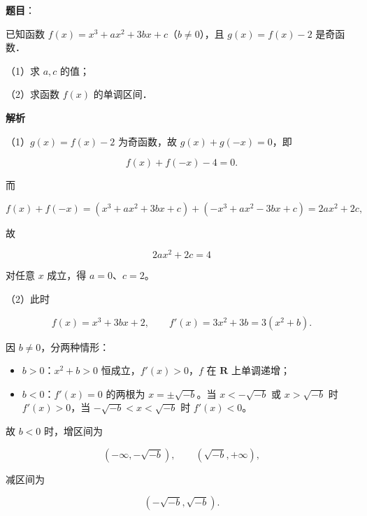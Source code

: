 \begin{answer}

\textbf{题目}：

已知函数 $f(x)=x^3+ax^2+3bx+c$（$b\neq0$），且 $g(x)=f(x)-2$ 是奇函数．

（1）求 $a,c$ 的值；

（2）求函数 $f(x)$ 的单调区间．

\textbf{解析}

（1）$g(x)=f(x)-2$ 为奇函数，故 $g(x)+g(-x)=0$，即

\nopagebreak[4]
\[f(x)+f(-x)-4=0 .\]

而

\nopagebreak[4]
\[f(x)+f(-x)=(x^3+ax^2+3bx+c)+(-x^3+ax^2-3bx+c)=2ax^2+2c,\]

故

\nopagebreak[4]
\[2ax^2+2c=4\]

对任意 $x$ 成立，得 $a=0$、$c=2$。

（2）此时

\nopagebreak[4]
\[f(x)=x^3+3bx+2,\qquad f'(x)=3x^2+3b=3(x^2+b).\]

因 $b\neq0$，分两种情形：

\begin{itemize}
\item $b>0$：$x^2+b>0$ 恒成立，$f'(x)>0$，$f$ 在 $\mathbf R$ 上单调递增；
\item $b<0$：$f'(x)=0$ 的两根为 $x=\pm\sqrt{-b}$。当 $x<-\sqrt{-b}$ 或 $x>\sqrt{-b}$ 时 $f'(x)>0$，当 $-\sqrt{-b}<x<\sqrt{-b}$ 时 $f'(x)<0$。
\end{itemize}

故 $b<0$ 时，增区间为

\nopagebreak[4]
\[(-\infty,-\sqrt{-b}),\qquad(\sqrt{-b},+\infty),\]

减区间为

\nopagebreak[4]
\[(-\sqrt{-b},\sqrt{-b}).\]


\end{answer}
